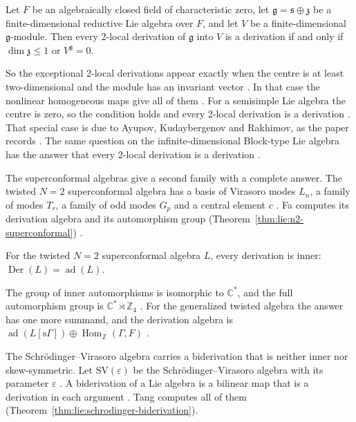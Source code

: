 \begin{theorem}\label{thm:lie:two-local-reductive}
Let $F$ be an algebraically closed field of characteristic zero, let
$\mathfrak{g}=\mathfrak{s}\oplus\mathfrak{z}$ be a finite-dimensional
reductive Lie algebra over $F$, and let $V$ be a finite-dimensional
$\mathfrak{g}$-module. Then every 2-local derivation of $\mathfrak{g}$
into $V$ is a derivation if and only if $\dim\mathfrak{z}\leq 1$ or
$V^{\mathfrak{g}}=0$.
\end{theorem}

So the exceptional 2-local derivations appear exactly when the centre is at
least two-dimensional and the module has an invariant vector
\cite[p.~2]{ChenLuoXu2026}. In that case the nonlinear homogeneous maps give
all of them \cite[p.~2]{ChenLuoXu2026}. For a semisimple Lie algebra the
centre is zero, so the condition holds and every 2-local derivation is a
derivation \cite[p.~1]{ChenLuoXu2026}. That special case is due to Ayupov,
Kudaybergenov and Rakhimov, as the paper records
\cite[p.~1]{ChenLuoXu2026}. The same question on
the infinite-dimensional Block-type Lie algebra has the answer that every
2-local derivation is a derivation \cite[Theorem~3.6, p.~9]{ChenGuo2026}.

The superconformal algebras give a second family with a complete answer. The
twisted $N=2$ superconformal algebra has a basis of Virasoro modes $L_n$, a
family of modes $T_r$, a family of odd modes $G_p$ and a central element $c$
\cite[p.~1]{Fa2013N2}. Fa computes its derivation algebra and its automorphism
group (Theorem~\ref{thm:lie:n2-superconformal}) \cite[p.~2]{Fa2013N2}.

\begin{theorem}[{\cite[Theorem~1.1, p.~2]{Fa2013N2}}]\label{thm:lie:n2-superconformal}
For the twisted $N=2$ superconformal algebra $L$, every derivation is inner:
$\operatorname{Der}(L)=\operatorname{ad}(L)$.
\end{theorem}

The group of inner automorphisms is isomorphic to $\mathbb{C}^{*}$, and the full
automorphism group is $\mathbb{C}^{*}\rtimes\mathbb{Z}_4$
\cite[Theorem~1.5 and Corollary~1.6, p.~4]{Fa2013N2}. For the generalized
twisted algebra the answer has one more summand, and the derivation algebra is
$\operatorname{ad}(L[\mathrm{s}\Gamma])\oplus\operatorname{Hom}_{\mathbb{Z}}(\Gamma,F)$
\cite[Theorem~4.1, p.~18]{Fa2013N2}.

The Schrödinger--Virasoro algebra carries a biderivation that is neither inner
nor skew-symmetric. Let $\mathrm{SV}(\varepsilon)$ be the Schrödinger--Virasoro
algebra with its parameter $\varepsilon$ \cite[p.~1]{Tang2016Schrodinger}. A
biderivation of a Lie algebra is a bilinear map that is a derivation in each
argument \cite[p.~2]{Tang2016Schrodinger}. Tang computes all of them (Theorem~\ref{thm:lie:schrodinger-biderivation}).

